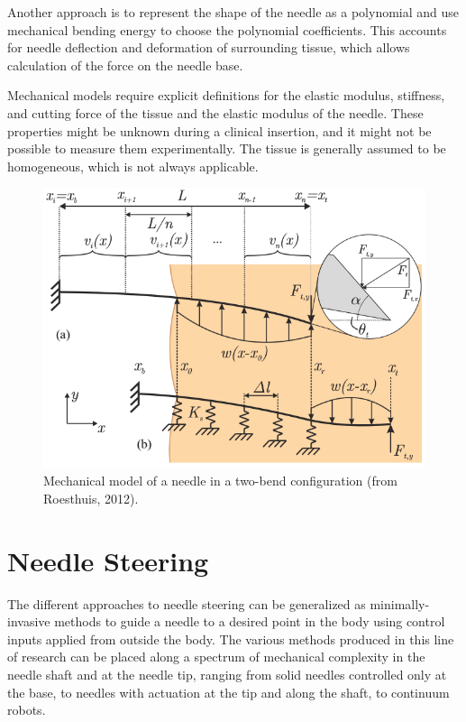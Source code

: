 Another approach is to represent the shape of the needle as a polynomial and use mechanical bending energy to choose the polynomial coefficients\cite{roesthuis_modeling_2015,misra_mechanics_2010,abayazid_integrating_2013}. This accounts for needle deflection and deformation of surrounding tissue, which allows calculation of the force on the needle base.

Mechanical models require explicit definitions for the elastic modulus, stiffness, and cutting force of the tissue and the elastic modulus of the needle. These properties might be unknown during a clinical insertion, and it might not be possible to measure them experimentally. The tissue is generally assumed to be homogeneous, which is not always applicable.

\begin{figure}[h]
\includegraphics[width=1.0\textwidth]{Fig/chap2/roesthuis_two_bend_beam.png}
\caption{Mechanical model of a needle in a two-bend configuration (from Roesthuis, 2012).}
\label{fig:needle_mech_model}
\end{figure}

\section{Needle Steering}

The different approaches to needle steering can be generalized as minimally-invasive methods to guide a needle to a desired point in the body using control inputs applied from outside the body. The various methods produced in this line of research can be placed along a spectrum of mechanical complexity in the needle shaft and at the needle tip, ranging from solid needles controlled only at the base, to needles with actuation at the tip and along the shaft, to continuum robots. 


